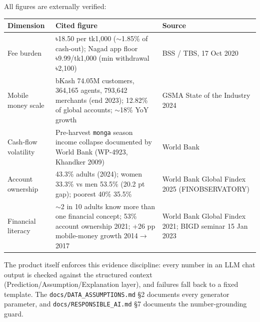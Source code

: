 \documentclass[11pt, a4paper]{article}
\begin{document}
All figures are externally verified:

\begin{table}[h]
\centering
\begin{tabular}{@{}p{3.2cm}p{5.8cm}p{3cm}@{}}
\toprule
\textbf{Dimension} & \textbf{Cited figure} & \textbf{Source} \\ \midrule
Fee burden & ৳18.50 per tk1,000 ($\sim$1.85\% of cash-out); Nagad app floor ৳9.99/tk1,000 (min withdrawal ৳2,100) & BSS / TBS, 17 Oct 2020 \\
Mobile money scale & bKash 74.05M customers, 364,165 agents, 793,642 merchants (end 2023); 12.82\% of global accounts; $\sim$18\% YoY growth & GSMA State of the Industry 2024 \\
Cash-flow volatility & Pre-harvest \texttt{monga} season income collapse documented by World Bank (WP-4923, Khandker 2009) & World Bank \\
Account ownership & 43.3\% adults (2024); women 33.3\% vs men 53.5\% (20.2 pt gap); poorest 40\% 35.5\% & World Bank Global Findex 2025 (FINOBSERVATORY) \\
Financial literacy & $\sim$2 in 10 adults know more than one financial concept; 53\% account ownership 2021; +26 pp mobile-money growth 2014$\rightarrow$2017 & World Bank Global Findex 2021; BIGD seminar 15 Jan 2023 \\ \bottomrule
\end{tabular}
\end{table}

The product itself enforces this evidence discipline: every number in an LLM chat
output is checked against the structured context (Prediction/Assumption/Explanation
layer), and failures fall back to a fixed template. The
\texttt{docs/DATA\_ASSUMPTIONS.md} \S2 documents every generator parameter, and
\texttt{docs/RESPONSIBLE\_AI.md} \S7 documents the number-grounding guard.


\newpage

\end{document}
